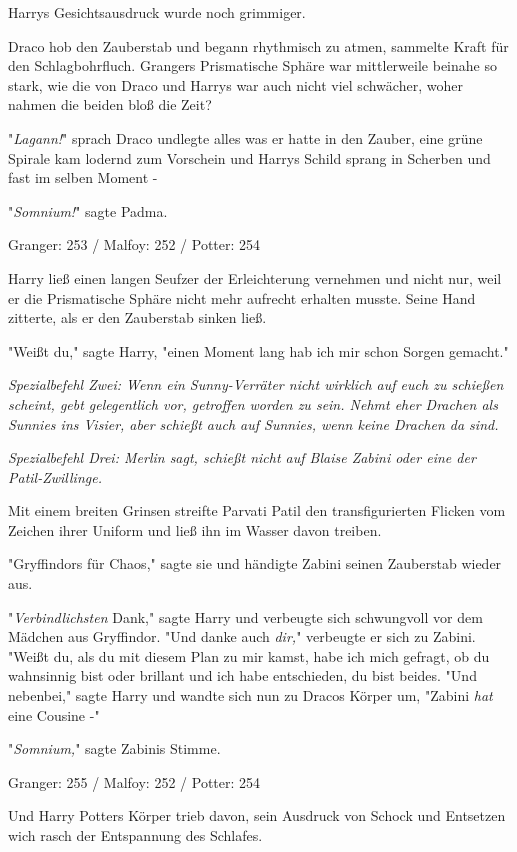 {Harrys Gesichtsausdruck wurde noch grimmiger.

Draco hob den Zauberstab und begann rhythmisch zu atmen, sammelte Kraft für den Schlagbohrfluch. Grangers Prismatische Sphäre war mittlerweile beinahe so stark, wie die von Draco und Harrys war auch nicht viel schwächer, woher nahmen die beiden bloß die Zeit?

"\emph{Lagann!}" sprach Draco undlegte alles was er hatte in den Zauber, eine grüne Spirale kam lodernd zum Vorschein und Harrys Schild sprang in Scherben und fast im selben Moment -

"\emph{Somnium!}" sagte Padma.

\later

Granger: 253 / Malfoy: 252 / Potter: 254

Harry ließ einen langen Seufzer der Erleichterung vernehmen und nicht nur, weil er die Prismatische Sphäre nicht mehr aufrecht erhalten musste. Seine Hand zitterte, als er den Zauberstab sinken ließ.

"Weißt du," sagte Harry, "einen Moment lang hab ich mir schon Sorgen gemacht."

\emph{Spezialbefehl Zwei: Wenn ein Sunny-Verräter nicht wirklich auf euch zu schießen scheint, gebt gelegentlich vor, getroffen worden zu sein. Nehmt eher Drachen als Sunnies ins Visier, aber schießt auch auf Sunnies, wenn keine Drachen da sind.}

\emph{Spezialbefehl Drei: Merlin sagt, schießt nicht auf Blaise Zabini oder eine der Patil-Zwillinge.}

Mit einem breiten Grinsen streifte Parvati Patil den transfigurierten Flicken vom Zeichen ihrer Uniform und ließ ihn im Wasser davon treiben.

"Gryffindors für Chaos," sagte sie und händigte Zabini seinen Zauberstab wieder aus.

"\emph{Verbindlichsten} Dank," sagte Harry und verbeugte sich schwungvoll vor dem Mädchen aus Gryffindor. "Und danke auch \emph{dir,}" verbeugte er sich zu Zabini. "Weißt du, als du mit diesem Plan zu mir kamst, habe ich mich gefragt, ob du wahnsinnig bist oder brillant und ich habe entschieden, du bist beides. "Und nebenbei," sagte Harry und wandte sich nun zu Dracos Körper um, "Zabini \emph{hat} eine Cousine -"

"\emph{Somnium,}" sagte Zabinis Stimme.

\later

Granger: 255 / Malfoy: 252 / Potter: 254

Und Harry Potters Körper trieb davon, sein Ausdruck von Schock und Entsetzen wich rasch der Entspannung des Schlafes.

}
